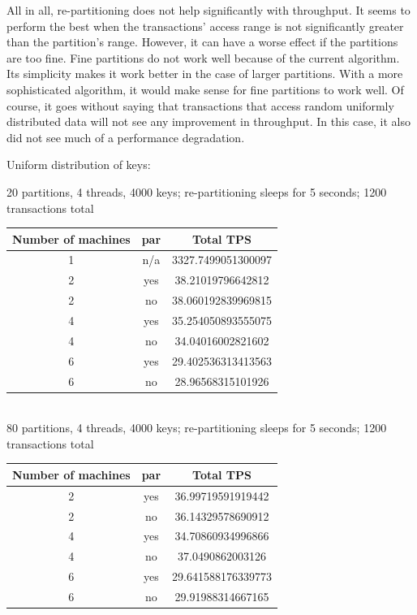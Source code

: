 \documentclass[a4paper, 10pt, notitlepage]{article}
\begin{document}
All in all, re-partitioning does not help significantly with throughput. It seems to perform the best when 
the transactions' access range is not significantly greater than the partition's range. However, it can have
a worse effect if the partitions are too fine. Fine partitions do not work well because of the current algorithm.
Its simplicity makes it work better in the case of larger partitions. With a more sophisticated algorithm,
it would make sense for fine partitions to work well. Of course, it goes without saying that transactions that
access random uniformly distributed data will not see any improvement in throughput. In this case, it also
did not see much of a performance degradation.


\iffalse
Uniform distribution of keys:

20 partitions, 4 threads, 4000 keys; re-partitioning sleeps for 5 seconds; 1200 transactions total

\begin{tabular}{c c c}
Number of machines & par & Total TPS \\
\hline
1 & n/a & 3327.7499051300097 \\
2 & yes & 38.21019796642812\\
2 & no & 38.060192839969815\\
4 & yes & 35.254050893555075\\
4 & no & 34.04016002821602\\
6 & yes & 29.402536313413563 \\
6 & no & 28.96568315101926 \\
\end{tabular}

\\

80 partitions, 4 threads, 4000 keys; re-partitioning sleeps for 5 seconds; 1200 transactions total

\begin{tabular}{c c c}
Number of machines & par & Total TPS \\
\hline
2 & yes & 36.99719591919442\\
2 & no & 36.14329578690912\\
4 & yes & 34.70860934996866\\
4 & no & 37.0490862003126\\
6 & yes & 29.641588176339773\\
6 & no & 29.91988314667165\\
\end{tabular}
\end{document}
